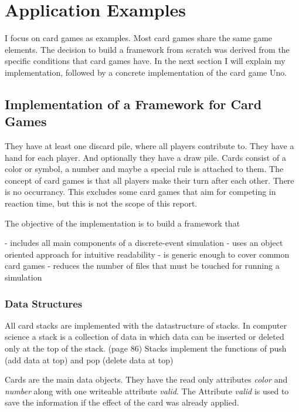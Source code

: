 
\section{Application Examples}



I focus on card games as examples. Most card games share the same game elements. The decision to build a framework from scratch was derived from the specific conditions that card games have.
In the next section I will explain my implementation, followed by a concrete implementation of the card game Uno.

\subsection{Implementation of a Framework for Card Games}

They have at least one discard pile, where all players contribute to. They have a hand for each player. And optionally they have a draw pile. Cards consist of a color or symbol, a number and maybe a special rule is attached to them.
The concept of card games is that all players make their turn after each other. There is no occurrancy. This excludes some card games that aim for competing in reaction time, but this is not the scope of this report. 



The objective of the implementation is to build a framework that 

- includes all main components of a discrete-event simulation
- uses an object oriented approach for intuitive readability
- is generic enough to cover common card games
- reduces the number of files that must be touched for running a simulation

\subsubsection{Data Structures}

All card stacks are implemented with the datastructure of stacks. In computer science a stack is a collection of data in which data can be inserted or deleted only at the top of the stack. \cite{patel2018data} (page 86)
Stacks implement the functions of push (add data at top) and pop (delete data at top)

Cards are the main data objects. They have the read only attributes \textit{color} and \textit{number} along with one writeable attribute \textit{valid}.
The Attribute \textit{valid} is used to save the information if the effect of the card was already applied. 

